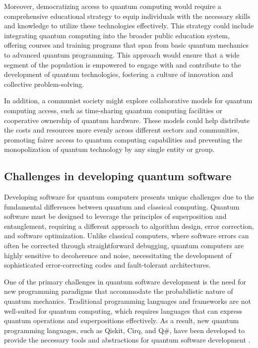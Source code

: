 Moreover, democratizing access to quantum computing would require a comprehensive educational strategy to equip individuals with the necessary skills and knowledge to utilize these technologies effectively. This strategy could include integrating quantum computing into the broader public education system, offering courses and training programs that span from basic quantum mechanics to advanced quantum programming. This approach would ensure that a wide segment of the population is empowered to engage with and contribute to the development of quantum technologies, fostering a culture of innovation and collective problem-solving.

In addition, a communist society might explore collaborative models for quantum computing access, such as time-sharing quantum computing facilities or cooperative ownership of quantum hardware. These models could help distribute the costs and resources more evenly across different sectors and communities, promoting fairer access to quantum computing capabilities and preventing the monopolization of quantum technology by any single entity or group.

\subsection{Challenges in developing quantum software}

Developing software for quantum computers presents unique challenges due to the fundamental differences between quantum and classical computing. Quantum software must be designed to leverage the principles of superposition and entanglement, requiring a different approach to algorithm design, error correction, and software optimization. Unlike classical computers, where software errors can often be corrected through straightforward debugging, quantum computers are highly sensitive to decoherence and noise, necessitating the development of sophisticated error-correcting codes and fault-tolerant architectures.

One of the primary challenges in quantum software development is the need for new programming paradigms that accommodate the probabilistic nature of quantum mechanics. Traditional programming languages and frameworks are not well-suited for quantum computing, which requires languages that can express quantum operations and superpositions effectively. As a result, new quantum programming languages, such as Qiskit, Cirq, and Q\#, have been developed to provide the necessary tools and abstractions for quantum software development \cite[pp.~150-155]{Cross2017}.

